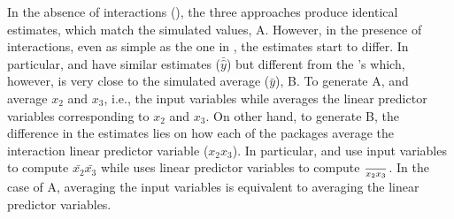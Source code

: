 %
In the absence of interactions (), the three approaches produce identical estimates, which match the simulated values, A. However, in the presence of interactions, even as simple as the one in , the estimates start to differ. In particular,  and  have similar estimates ($\bar{\hat{y}}$) but different from the 's which, however, is very close to the simulated average ($\bar{y}$), B. To generate A,   and  average $x_2$ and $x_3$, i.e., the input variables while  averages the linear predictor variables corresponding to $x_2$ and $x_3$. On other hand, to generate B, the difference in the estimates lies on how each of the packages average the interaction linear predictor variable ($x_2x_3$). In particular,  and  use input variables to compute $\bar{x_2}\bar{x_3}$ while  uses linear predictor variables to compute $\over{x_2x_3}$. In the case of A, averaging the input variables is equivalent to averaging the linear predictor variables.

